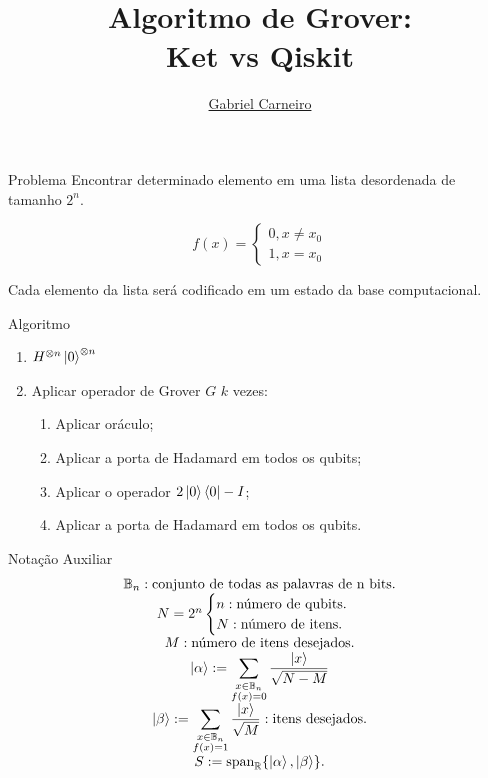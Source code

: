 \documentclass[
    12pt,
    xcolor={svgnames},
]{beamer}
\title{Algoritmo de Grover: \\ Ket vs Qiskit}
\author{\href{https://github.com/G-Carneiro}{Gabriel Carneiro}}
\begin{document}
    \begin{frame}[plain]
        \titlepage
    \end{frame}

    \begin{frame}{Problema}
        Encontrar determinado elemento em uma lista desordenada de tamanho $2^n$.

        \[
            f(x) =
            \begin{cases}
                0, x \ne x_0 \\
                1, x = x_0
            \end{cases}
        \]

        Cada elemento da lista será codificado em um estado da base computacional.
    \end{frame}

    \begin{frame}{Algoritmo}
        \begin{enumerate}
            \item $H^{\otimes n} \ket{0}^{\otimes n}$
            \item Aplicar operador de Grover $G$ $k$ vezes:
            \begin{enumerate}
                \item Aplicar oráculo;
                \item Aplicar a porta de Hadamard em todos os qubits;
                \item Aplicar o operador $2 \ket{0}\bra{0} - I$;
                \item Aplicar a porta de Hadamard em todos os qubits.
            \end{enumerate}
        \end{enumerate}
    \end{frame}

    \begin{frame}{Notação Auxiliar}
        \[
        \begin{matrix}
            \mathbb{B}_n: \text{conjunto de todas as palavras de n bits}. \\
            N = 2^n
            \begin{cases}
                n: \text{número de qubits}. \\
                N: \text{número de itens}.
            \end{cases} \\
            M: \text{número de itens desejados}. \\
            \ket{\alpha} := \displaystyle \sum_{\substack{x \in \mathbb{B}_n \\ f(x) = 0}} \frac{\ket{x}}{\sqrt{N - M}} \\
            \ket{\beta} := \displaystyle \sum_{\substack{x \in \mathbb{B}_n \\ f(x) = 1}} \dfrac{\ket{x}}{\sqrt{M}} : \text{itens desejados}. \\
            S := \text{span}_\mathbb{R} \{ \ket{\alpha}, \ket{\beta} \}.
        \end{matrix}
        \]
    \end{frame}
\end{document}
